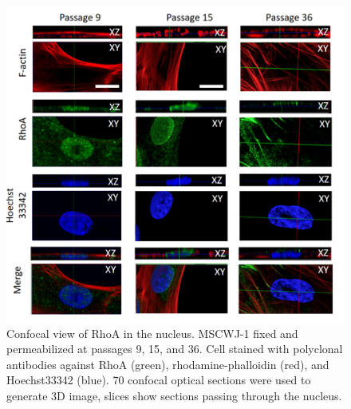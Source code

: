 \documentclass[alpha-refs]{wiley-article}
\begin{document}
\begin{figure}[hbt!]
  \includegraphics[width=0.9\linewidth]{rho-3d.png}
  \caption{Confocal view of RhoA in the nucleus. MSCWJ-1 fixed and permeabilized at passages 9, 15, and 36. Cell stained with polyclonal antibodies against RhoA (green), rhodamine-phalloidin (red), and Hoechst33342 (blue). 70 confocal optical sections were used to generate 3D image, slices show sections passing through the nucleus.}
  \centering
\end{figure}
\end{document}
